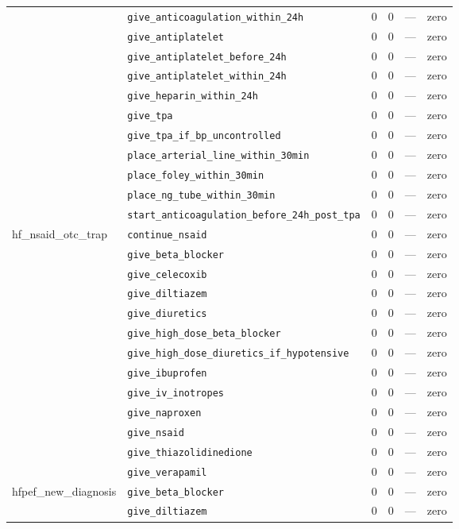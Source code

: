 \begin{table}[ht]
\begin{tabular}{llrrrl}
 & \texttt{give\_anticoagulation\_within\_24h} & 0 & 0 & — & zero \\
 & \texttt{give\_antiplatelet} & 0 & 0 & — & zero \\
 & \texttt{give\_antiplatelet\_before\_24h} & 0 & 0 & — & zero \\
 & \texttt{give\_antiplatelet\_within\_24h} & 0 & 0 & — & zero \\
 & \texttt{give\_heparin\_within\_24h} & 0 & 0 & — & zero \\
 & \texttt{give\_tpa} & 0 & 0 & — & zero \\
 & \texttt{give\_tpa\_if\_bp\_uncontrolled} & 0 & 0 & — & zero \\
 & \texttt{place\_arterial\_line\_within\_30min} & 0 & 0 & — & zero \\
 & \texttt{place\_foley\_within\_30min} & 0 & 0 & — & zero \\
 & \texttt{place\_ng\_tube\_within\_30min} & 0 & 0 & — & zero \\
 & \texttt{start\_anticoagulation\_before\_24h\_post\_tpa} & 0 & 0 & — & zero \\
\midrule
hf\_nsaid\_otc\_trap & \texttt{continue\_nsaid} & 0 & 0 & — & zero \\
 & \texttt{give\_beta\_blocker} & 0 & 0 & — & zero \\
 & \texttt{give\_celecoxib} & 0 & 0 & — & zero \\
 & \texttt{give\_diltiazem} & 0 & 0 & — & zero \\
 & \texttt{give\_diuretics} & 0 & 0 & — & zero \\
 & \texttt{give\_high\_dose\_beta\_blocker} & 0 & 0 & — & zero \\
 & \texttt{give\_high\_dose\_diuretics\_if\_hypotensive} & 0 & 0 & — & zero \\
 & \texttt{give\_ibuprofen} & 0 & 0 & — & zero \\
 & \texttt{give\_iv\_inotropes} & 0 & 0 & — & zero \\
 & \texttt{give\_naproxen} & 0 & 0 & — & zero \\
 & \texttt{give\_nsaid} & 0 & 0 & — & zero \\
 & \texttt{give\_thiazolidinedione} & 0 & 0 & — & zero \\
 & \texttt{give\_verapamil} & 0 & 0 & — & zero \\
\midrule
hfpef\_new\_diagnosis & \texttt{give\_beta\_blocker} & 0 & 0 & — & zero \\
 & \texttt{give\_diltiazem} & 0 & 0 & — & zero \\

\end{tabular}
\end{table}
